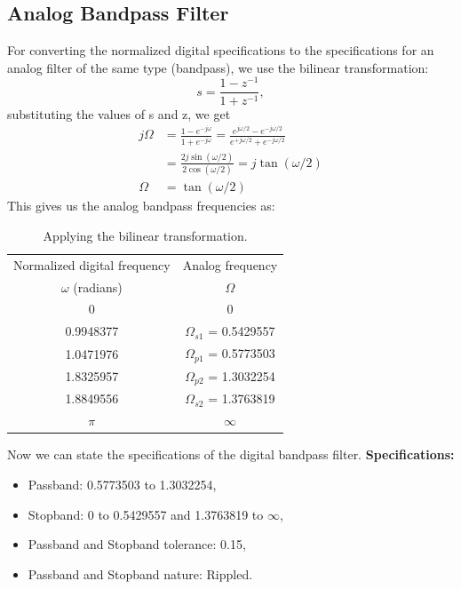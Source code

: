 \documentclass[12pt]{article}
\begin{document}
\subsection{Analog Bandpass Filter}
For converting the normalized digital specifications to the specifications for an analog filter of the same type (bandpass), we use the bilinear transformation:
\[s = \frac{1-z^{-1}}{1+z^{-1}},\]
substituting the values of s and z, we get
\begin{align*}
    j\Omega &= \frac{1-e^{-j\omega}}{1+e^{-j\omega}} = \frac{e^{j\omega/2}-e^{-j\omega/2}}{e^{+j\omega/2}+e^{-j\omega/2}}\\
    &= \frac{2j\sin(\omega/2)}{2\cos(\omega/2)} = j\tan(\omega/2)\\
    \Omega &= \tan(\omega/2)
\end{align*}
This gives us the analog bandpass frequencies as:
\begin{table}[h]
    \centering
    \begin{tabular}{|c|c|}\hline
         Normalized digital frequency&Analog frequency\\
         $\omega$ (radians)&$\Omega$\\\hline
         0&0\\\hline
         0.9948377&$\Omega_{s1}$ = 0.5429557\\\hline
         1.0471976&$\Omega_{p1}$ = 0.5773503\\\hline
         1.8325957&$\Omega_{p2}$ = 1.3032254\\\hline
         1.8849556&$\Omega_{s2}$ = 1.3763819\\\hline
         $\pi$&$\infty$\\\hline
    \end{tabular}
    \caption{Applying the bilinear transformation.}
    \label{tab:2}
\end{table}

Now we can state the specifications of the digital bandpass filter.
\newline
\hline
\vspace{10pt}
\textbf{Specifications:}
\begin{itemize}
    \item Passband: 0.5773503 to 1.3032254,
    \item Stopband: 0 to 0.5429557 and 1.3763819 to  $\infty$,
    \item Passband and Stopband tolerance: 0.15,
    \item Passband and Stopband nature: Rippled.
\end{itemize}
\hline
\end{document}
